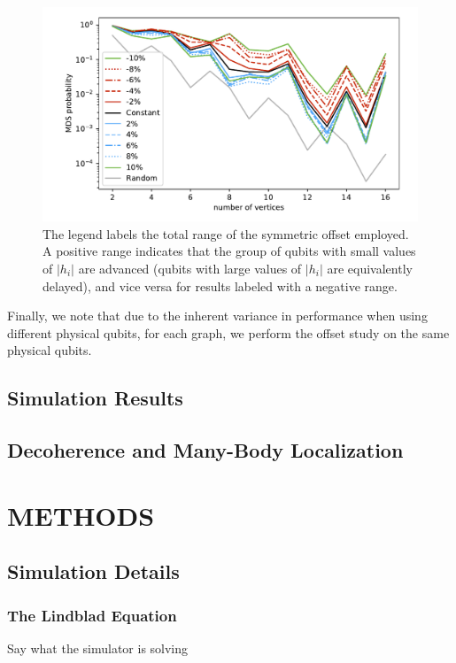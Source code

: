 \documentclass[prd,twocolumn,tightenlines,preprintnumbers,showpacs,superscriptaddress,notitlepage,nofootinbib,eqsecnum,floatfix,longbibliography]{revtex4}
\begin{document}
\begin{figure}[b]
	\centering
	\includegraphics[width=\columnwidth]{./figures/scaling_comparison_all.pdf}
	\caption{The legend labels the total range of the symmetric offset employed. A positive range indicates that the group of qubits with small values of $|h_i|$ are advanced (qubits with large values of $|h_i|$ are equivalently delayed), and vice versa for results labeled with a negative range.}
	\label{fig:dwave_offset}
\end{figure}

Finally, we note that due to the inherent variance in performance when using different physical qubits, for each graph, we perform the offset study on the same physical qubits.

\subsection{Simulation Results}

\subsection{Decoherence and Many-Body Localization}

\section{METHODS}
\subsection{Simulation Details}
\subsubsection{The Lindblad Equation}
Say what the simulator is solving
\end{document}
